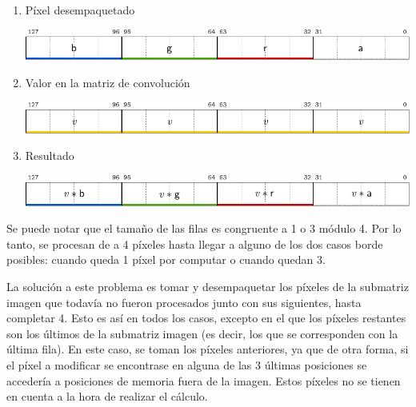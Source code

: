         \noindent \begin{minipage}{\textwidth}
          \begin{enumerate}
            \item Píxel desempaquetado

            {\centering \noindent {} \includegraphics{imagenes/blur-registros-2.pdf}}

            \item Valor en la matriz de convolución

            {\centering \noindent {} \includegraphics{imagenes/blur-registros-3.pdf}}

            \item Resultado

            {\centering {} \includegraphics{imagenes/blur-registros-4.pdf}}
          \end{enumerate}
        \end{minipage}

        \vspace{\baselineskip}

        Se puede notar que el tamaño de las filas es congruente a 1 o 3 módulo 4. Por lo tanto, se procesan de a 4 píxeles hasta llegar a alguno de los dos casos borde posibles: cuando queda 1 píxel por computar o cuando quedan 3. 
        
        La solución a este problema es tomar y desempaquetar los píxeles de la submatriz imagen que todavía no fueron procesados junto con sus siguientes, hasta completar 4. Esto es así en todos los casos, excepto en el que los píxeles restantes son los últimos de la submatriz imagen (es decir, los que se corresponden con la última fila). En este caso, se toman los píxeles anteriores, ya que de otra forma, si el píxel a modificar se encontrase en alguna de las 3 últimas posiciones se accedería a posiciones de memoria fuera de la imagen. Estos píxeles no se tienen en cuenta a la hora de realizar el cálculo.

